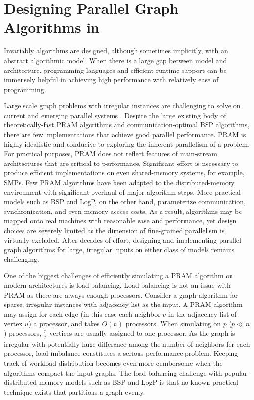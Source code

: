
\section{Designing Parallel Graph Algorithms in \Xten{}}
\label{s:design}

 Invariably algorithms are designed, although sometimes implicitly, with an abstract algorithmic model. 
When there is a large gap between model and architecture, programming languages and efficient runtime support can be immensely helpful in achieving high performance with relatively ease of programming. 

 Large scale graph problems with irregular instances are challenging to solve on current and emerging parallel systems \cite{BC07}. Despite the large existing body of theoretically-fast PRAM algorithms and communication-optimal BSP algorithms, there are few implementations that achieve good parallel performance.
PRAM is highly idealistic and conducive to exploring the inherent parallelism of a problem. For practical purposes, PRAM does not reflect features of main-stream architectures that are critical to performance. Significant effort is necessary to produce efficient implementations on even shared-memory systems, for example, SMPs. Few PRAM algorithms have been adapted to the distributed-memory environment with significant overhaul of major algorithm steps. More practical models such as BSP and LogP, on the other hand, parameterize communication, synchronization, and even memory access costs. As a result, algorithms may be mapped onto real machines with reasonable ease and performance, yet design choices are severely limited as the dimension of fine-grained parallelism is virtually excluded. After decades of effort, designing and implementing parallel graph algorithms for large, irregular inputs on either class of models remains challenging. 

 One of the biggest challenges of efficiently simulating a PRAM algorithm on modern architectures is load balancing. Load-balancing is not an issue with PRAM as there are always enough processors. Consider a graph algorithm for sparse, irregular instances with adjacency list as the input. A PRAM algorithm may assign for each edge (in this case each neighbor $v$ in the adjacency list of vertex $u$) a processor, and takes $O(n)$ processors. When simulating on $p$ ($p\ll n$) processors, $\frac{n}{p}$ vertices are usually assigned to one processor. As the graph is irregular with potentially huge difference among the number of neighbors for each processor, load-imbalance constitutes a serious performance problem. Keeping track of workload distribution becomes even more cumbersome when the algorithms compact the input graphs. The load-balancing challenge with popular distributed-memory models such as BSP and LogP is that no known practical technique exists that partitions a graph evenly.

